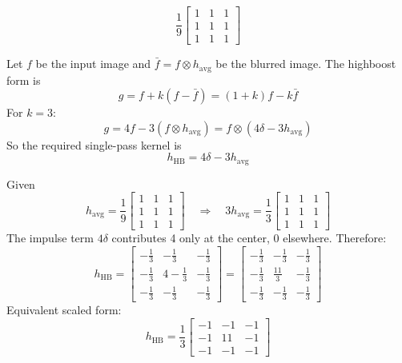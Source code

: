 \documentclass[12pt]{article}
\begin{document}
\[
\frac{1}{9}
\begin{bmatrix}
1 & 1 & 1 \\
1 & 1 & 1 \\
1 & 1 & 1
\end{bmatrix}
\]

\vspace{0.4cm}

\begin{stepbox}
Let $f$ be the input image and $\bar{f}=f \otimes h_{\text{avg}}$ be the blurred image. The highboost form is
\[
g = f + k(f-\bar{f}) = (1+k)f - k\bar{f}
\]
For $k=3$:
\[
g = 4f - 3(f\otimes h_{\text{avg}}) = f \otimes \left(4\delta - 3h_{\text{avg}}\right)
\]
So the required single-pass kernel is
\[
h_{\text{HB}} = 4\delta - 3h_{\text{avg}}
\]
\end{stepbox}

\begin{stepbox}
Given
\[
h_{\text{avg}} = \frac{1}{9}
\begin{bmatrix}
1 & 1 & 1 \\
1 & 1 & 1 \\
1 & 1 & 1
\end{bmatrix}
\quad\Rightarrow\quad
3h_{\text{avg}} = \frac{1}{3}
\begin{bmatrix}
1 & 1 & 1 \\
1 & 1 & 1 \\
1 & 1 & 1
\end{bmatrix}
\]
The impulse term $4\delta$ contributes 4 only at the center, 0 elsewhere. Therefore:
\[
h_{\text{HB}} =
\begin{bmatrix}
-\frac13 & -\frac13 & -\frac13 \\
-\frac13 & 4-\frac13 & -\frac13 \\
-\frac13 & -\frac13 & -\frac13
\end{bmatrix}
=
\begin{bmatrix}
-\frac13 & -\frac13 & -\frac13 \\
-\frac13 & \frac{11}{3} & -\frac13 \\
-\frac13 & -\frac13 & -\frac13
\end{bmatrix}
\]
Equivalent scaled form:
\[
h_{\text{HB}} = \frac13
\begin{bmatrix}
-1 & -1 & -1 \\
-1 & 11 & -1 \\
-1 & -1 & -1
\end{bmatrix}
\]
\end{stepbox}
\end{document}
